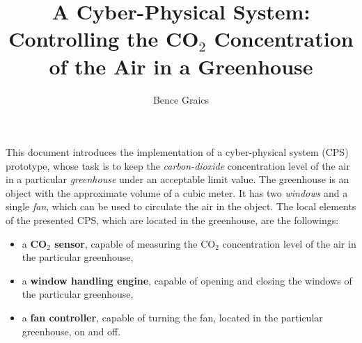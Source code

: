 \documentclass[a4paper, 11pt]{article}
\begin{document}
	
	\newcommand{\cmark}{\ding{51}}%
	\newcommand{\xmark}{\ding{55}}%
	
	\newcommand{\specialcell}[2][c]{%
		\begin{tabular}[#1]{@{}c@{}}#2\end{tabular}}
	
	\newenvironment*{mytable}[3]{
		\begin{table}[htbp]	
			\caption{#1}          
			\label{tab:#2}            
			\center%
			\begin{tabular}{#3}
			}
			{
			\end{tabular}
		\end{table}
	}
	
	\pagestyle{plain}
	
	
	
	\nonfrenchspacing
	\setlength{\parindent}{0em}
	\setlength{\parskip}{0.45em}
	
	\title{A Cyber-Physical System:\\Controlling the CO$_2$ Concentration of the Air in a Greenhouse}
	\date{}
	\author{Bence Graics}	
	
	\maketitle
	\tableofcontents
	\newpage
	
	This document introduces the implementation of a cyber-physical system (CPS) prototype, whose task is to keep the \emph{carbon-dioxide} concentration level of the air in a particular \emph{greenhouse} under an acceptable limit value.
	The greenhouse is an object with the approximate volume of a cubic meter. It has two \emph{windows} and a single \emph{fan}, which can be used to circulate the air in the object. The local elements of the presented CPS, which are located in the greenhouse, are the followings:
	\begin{itemize}
		\item a \textbf{CO$_2$ sensor}, capable of measuring the CO$_2$ concentration level of the air in the particular greenhouse,
		\item a \textbf{window handling engine}, capable of opening and closing the windows of the particular greenhouse,
		\item a \textbf{fan controller}, capable of turning the fan, located in the particular greenhouse, on and off.
	\end{itemize}
	
\end{document}
